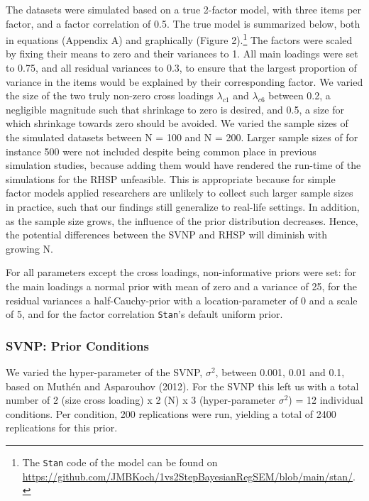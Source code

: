 \documentclass[
  man, donotrepeattitle,floatsintext]{apa6}
\begin{document}
The datasets were simulated based on a true 2-factor model, with three
items per factor, and a factor correlation of 0.5. The true model is
summarized below, both in equations (Appendix A) and graphically (Figure
2).\footnote{The \texttt{Stan} code of the model can be found on
  \url{https://github.com/JMBKoch/1vs2StepBayesianRegSEM/blob/main/stan/}.} The factors were scaled by fixing their means to zero and their
variances to 1. All main loadings were set to 0.75, and all residual
variances to 0.3, to ensure that the largest proportion of variance in
the items would be explained by their corresponding factor. We varied
the size of the two truly non-zero cross loadings \(\lambda_{c 1}\) and
\(\lambda_{c 6}\) between 0.2, a negligible magnitude such that shrinkage
to zero is desired, and 0.5, a size for which shrinkage towards zero
should be avoided. We varied the sample sizes of the simulated datasets
between N = 100 and N = 200. Larger sample sizes of for instance 500
were not included despite being common place in previous simulation
studies, because adding them would have rendered the run-time of the
simulations for the RHSP unfeasible. This is appropriate because for
simple factor models applied researchers are unlikely to collect such
larger sample sizes in practice, such that our findings still generalize
to real-life settings. In addition, as the sample size grows, the
influence of the prior distribution decreases. Hence, the potential
differences between the SVNP and RHSP will diminish with growing N.

For all parameters except the cross loadings, non-informative priors
were set: for the main loadings a normal prior with mean of zero and a
variance of 25, for the residual variances a half-Cauchy-prior with a
location-parameter of 0 and a scale of 5, and for the factor correlation
\texttt{Stan}'s default uniform prior.

\subsubsection{SVNP: Prior Conditions}\label{svnp-prior-conditions}

We varied the hyper-parameter of the SVNP, \(\sigma^2\), between 0.001,
0.01 and 0.1, based on Muthén and Asparouhov (2012). For the SVNP this left us
with a total number of 2 (size cross loading) x 2 (N) x 3
(hyper-parameter \(\sigma^2\)) = 12 individual conditions. Per condition,
200 replications were run, yielding a total of 2400 replications for
this prior.
\end{document}

